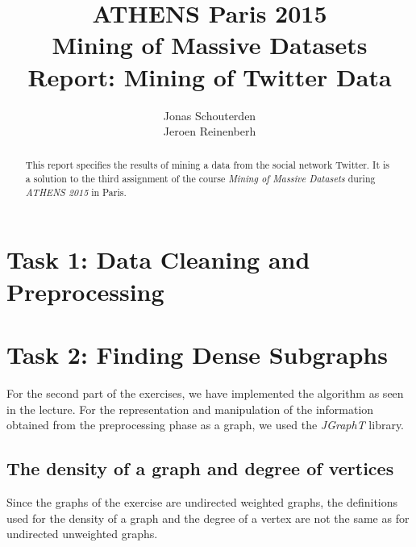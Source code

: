 \documentclass[10pt,a4paper]{article}
\author{Jonas Schouterden\\
Jeroen Reinenberh}
\title{ATHENS Paris 2015\\
Mining of Massive Datasets\\
Report: Mining of Twitter Data}
\begin{document}
\maketitle
\begin{abstract}
This report specifies the results of mining a data from the social network Twitter. It is a solution to the third assignment of the course \emph{Mining of Massive Datasets} during \emph{ATHENS 2015} in Paris.
\end{abstract}

\section{Task 1: Data Cleaning and Preprocessing}

\section{Task 2: Finding Dense Subgraphs}

For the second part of the exercises, we have implemented the algorithm as seen in the lecture.
For the representation and manipulation of the information obtained from the preprocessing phase as a graph, we used the \emph{JGraphT} library.

\subsection{The density of a graph and degree of vertices}

Since the graphs of the exercise are undirected weighted graphs, the definitions used for the density of a graph and the degree of a vertex are not the same as for undirected unweighted graphs.
\end{document}
